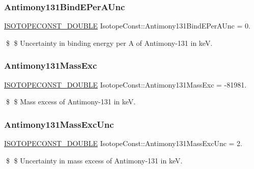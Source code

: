 \subsubsection{\texorpdfstring{Antimony131\+Bind\+E\+Per\+A\+Unc}{Antimony131BindEPerAUnc}}
{\footnotesize\ttfamily \mbox{\hyperlink{group___isotope_const-_macros_ga8f45a7272ce02c0b4c65c44636ed719a}{I\+S\+O\+T\+O\+P\+E\+C\+O\+N\+S\+T\+\_\+\+D\+O\+U\+B\+LE}} Isotope\+Const\+::\+Antimony131\+Bind\+E\+Per\+A\+Unc = 0.}

\$ \$ Uncertainty in binding energy per A of Antimony-\/131 in keV. \mbox{\label{group___isotope_const-_antimony-_sb131_ga5b1aad9d550a3220682bf4785f72989a}} 
\subsubsection{\texorpdfstring{Antimony131\+Mass\+Exc}{Antimony131MassExc}}
{\footnotesize\ttfamily \mbox{\hyperlink{group___isotope_const-_macros_ga8f45a7272ce02c0b4c65c44636ed719a}{I\+S\+O\+T\+O\+P\+E\+C\+O\+N\+S\+T\+\_\+\+D\+O\+U\+B\+LE}} Isotope\+Const\+::\+Antimony131\+Mass\+Exc = -\/81981.}

\$ \$ Mass excess of Antimony-\/131 in keV. \mbox{\label{group___isotope_const-_antimony-_sb131_ga418a88059970a5b181d30a791c6c0d9a}} 
\subsubsection{\texorpdfstring{Antimony131\+Mass\+Exc\+Unc}{Antimony131MassExcUnc}}
{\footnotesize\ttfamily \mbox{\hyperlink{group___isotope_const-_macros_ga8f45a7272ce02c0b4c65c44636ed719a}{I\+S\+O\+T\+O\+P\+E\+C\+O\+N\+S\+T\+\_\+\+D\+O\+U\+B\+LE}} Isotope\+Const\+::\+Antimony131\+Mass\+Exc\+Unc = 2.}

\$ \$ Uncertainty in mass excess of Antimony-\/131 in keV. \mbox{\label{group___isotope_const-_antimony-_sb131_gae4877044d8dea22ee361bfdb5e7d80dd}} 
